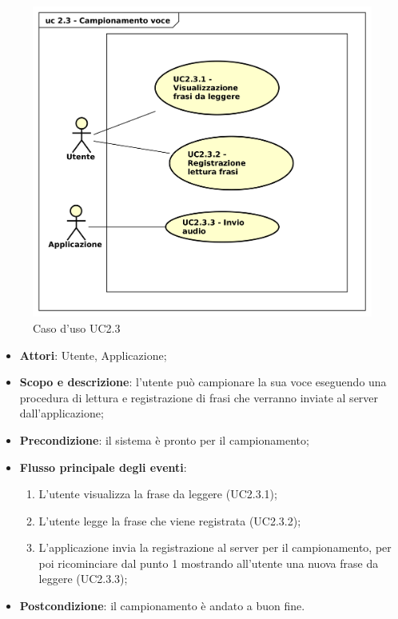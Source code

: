 \begin{figure}[htbp]
\centering
\includegraphics[scale=0.5]{UseCase_17_03_2016/immagini/uc_2_3_campionamento_voce.png}
\captionsetup{labelfont=bf}
\caption{Caso d'uso UC2.3}
\end{figure}

\begin{itemize}
\item \textbf{Attori}: Utente, Applicazione;
\item \textbf{Scopo e descrizione}: l'utente può campionare la sua voce  eseguendo una procedura di lettura e registrazione di frasi che verranno inviate al server dall'applicazione;
\item \textbf{Precondizione}: il sistema è pronto per il campionamento;
\item \textbf{Flusso principale degli eventi}:
\begin{enumerate}
\item L'utente visualizza la frase da leggere (UC2.3.1);
\item L'utente legge la frase che viene registrata (UC2.3.2);
\item L'applicazione invia la registrazione al server per il campionamento, per poi ricominciare dal punto 1 mostrando all'utente una nuova frase da leggere (UC2.3.3);
\end{enumerate}
\item \textbf{Postcondizione}: il campionamento è andato a buon fine.
\end{itemize}

